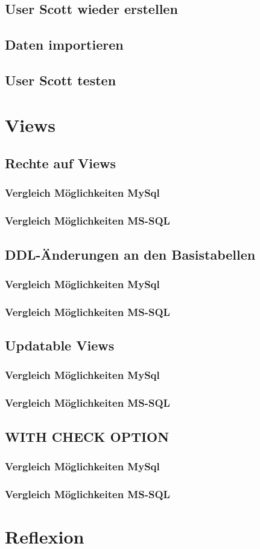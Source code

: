 \documentclass[11pt,a4paper,parskip=half]{scrartcl}
\begin{document}
\subsection{User Scott wieder erstellen}


\subsection{Daten importieren}


\subsection{User Scott testen}



\section{Views}
\subsection{Rechte auf Views}
\subsubsection{Vergleich Möglichkeiten MySql}
\subsubsection{Vergleich Möglichkeiten MS-SQL}

\subsection{DDL-Änderungen an den Basistabellen}
\subsubsection{Vergleich Möglichkeiten MySql}
\subsubsection{Vergleich Möglichkeiten MS-SQL}

\subsection{Updatable Views}
\subsubsection{Vergleich Möglichkeiten MySql}
\subsubsection{Vergleich Möglichkeiten MS-SQL}

\subsection{WITH CHECK OPTION}
\subsubsection{Vergleich Möglichkeiten MySql}
\subsubsection{Vergleich Möglichkeiten MS-SQL}

\section{Reflexion}
\end{document}
